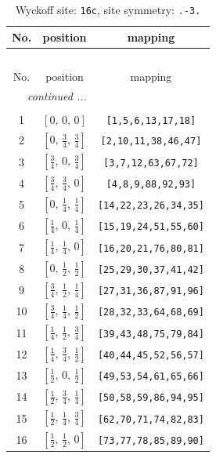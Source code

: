 \documentclass[fleqn,8pt]{jsarticle}
\begin{document}
\begin{longtable}{ccc}
\caption{Wyckoff site: {\tt 16c}, site symmetry: {\tt .-3.}}
 \\
 \hline \hline
No. & position & mapping \\ \hline \endfirsthead

\multicolumn{2}{l}{\tablename\ \thetable{}} \\
 \hline \hline
No. & position & mapping \\ \hline \endhead

 \hline \hline
\multicolumn{2}{r}{\footnotesize\it continued ...} \\ \endfoot

 \hline \hline
\multicolumn{2}{r}{} \\ \endlastfoot

1 & $\left[ 0,\, 0,\, 0 \right]$ & {\tt [1,5,6,13,17,18]} \\ \hline
2 & $\left[ 0,\, \frac{3}{4},\, \frac{3}{4} \right]$ & {\tt [2,10,11,38,46,47]} \\ \hline
3 & $\left[ \frac{3}{4},\, 0,\, \frac{3}{4} \right]$ & {\tt [3,7,12,63,67,72]} \\ \hline
4 & $\left[ \frac{3}{4},\, \frac{3}{4},\, 0 \right]$ & {\tt [4,8,9,88,92,93]} \\ \hline
5 & $\left[ 0,\, \frac{1}{4},\, \frac{1}{4} \right]$ & {\tt [14,22,23,26,34,35]} \\ \hline
6 & $\left[ \frac{1}{4},\, 0,\, \frac{1}{4} \right]$ & {\tt [15,19,24,51,55,60]} \\ \hline
7 & $\left[ \frac{1}{4},\, \frac{1}{4},\, 0 \right]$ & {\tt [16,20,21,76,80,81]} \\ \hline
8 & $\left[ 0,\, \frac{1}{2},\, \frac{1}{2} \right]$ & {\tt [25,29,30,37,41,42]} \\ \hline
9 & $\left[ \frac{3}{4},\, \frac{1}{2},\, \frac{1}{4} \right]$ & {\tt [27,31,36,87,91,96]} \\ \hline
10 & $\left[ \frac{3}{4},\, \frac{1}{4},\, \frac{1}{2} \right]$ & {\tt [28,32,33,64,68,69]} \\ \hline
11 & $\left[ \frac{1}{4},\, \frac{1}{2},\, \frac{3}{4} \right]$ & {\tt [39,43,48,75,79,84]} \\ \hline
12 & $\left[ \frac{1}{4},\, \frac{3}{4},\, \frac{1}{2} \right]$ & {\tt [40,44,45,52,56,57]} \\ \hline
13 & $\left[ \frac{1}{2},\, 0,\, \frac{1}{2} \right]$ & {\tt [49,53,54,61,65,66]} \\ \hline
14 & $\left[ \frac{1}{2},\, \frac{3}{4},\, \frac{1}{4} \right]$ & {\tt [50,58,59,86,94,95]} \\ \hline
15 & $\left[ \frac{1}{2},\, \frac{1}{4},\, \frac{3}{4} \right]$ & {\tt [62,70,71,74,82,83]} \\ \hline
16 & $\left[ \frac{1}{2},\, \frac{1}{2},\, 0 \right]$ & {\tt [73,77,78,85,89,90]} \\
\end{longtable}
\end{document}
